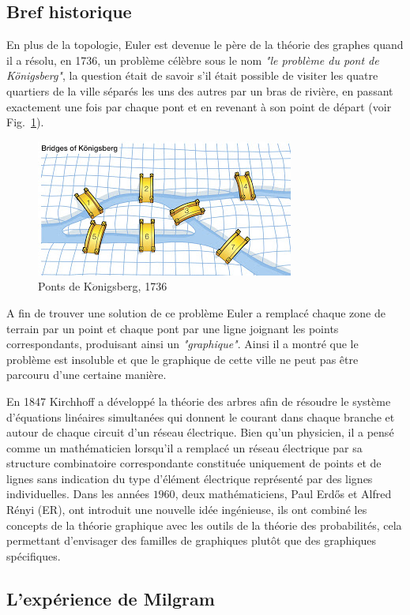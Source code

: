   \subsection{Bref historique}
  En plus de la topologie, Euler est devenue le père de la théorie des graphes quand il a résolu, en 1736, un problème célèbre
sous le nom \textit{"le problème du pont de K\"{o}nigsberg"}, la question était de savoir s'il était possible de visiter les quatre
quartiers de la ville séparés les uns des autres par un bras de rivière, en passant exactement une fois par chaque pont et en 
revenant à son point de départ (voir Fig.~\ref{Konig}).
\begin{figure}[h!]
\centering
\includegraphics[scale=0.7]{./figures/Konig}
\caption{Ponts de K$\ddot{o}$nigsberg, 1736}
\label{Konig}
\end{figure}
A fin de trouver une solution de ce problème Euler a remplacé chaque zone de terrain par un point et chaque pont par une ligne 
joignant les points correspondants, produisant ainsi un \textit{"graphique"}. Ainsi il a montré que le problème
est insoluble et que le graphique de cette ville ne peut pas être parcouru d'une certaine manière.

En 1847 Kirchhoff a développé la théorie des arbres afin de résoudre le système d'équations linéaires simultanées qui 
donnent le courant dans chaque branche et autour de chaque circuit d'un réseau électrique. Bien qu'un physicien, il a pensé comme un mathématicien lorsqu'il a remplacé un réseau électrique par sa structure combinatoire  correspondante constituée uniquement de points et de lignes sans indication du type d'élément électrique représenté par des lignes individuelles.
Dans les années $1960$, deux mathématiciens, Paul Erd\H{o}s et Alfred Rényi (ER), ont introduit une nouvelle idée ingénieuse, ils ont 
combiné les concepts de la théorie graphique avec les outils de la théorie des probabilités, cela permettant d'envisager des
familles de graphiques plutôt que des graphiques spécifiques.

  \subsection{L’expérience de Milgram}
  
